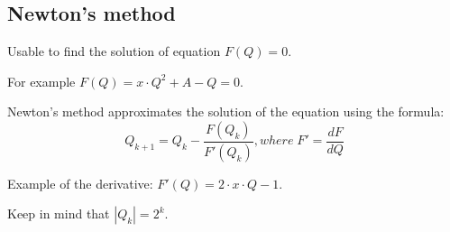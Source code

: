 \subsection*{Newton's method}

Usable to find the solution of equation $F(Q) = 0$.

For example $F(Q) = x \cdot Q^2 + A - Q = 0$.

Newton's method approximates the solution of the equation using the formula: 
$$Q_{k + 1} = Q_{k} - \frac{F(Q_k)}{F'(Q_k)}, where\; F' = \frac{dF}{dQ}$$

Example of the derivative: $F'(Q) = 2 \cdot x \cdot Q - 1$.

Keep in mind that $|Q_{k}| = 2^k$.

